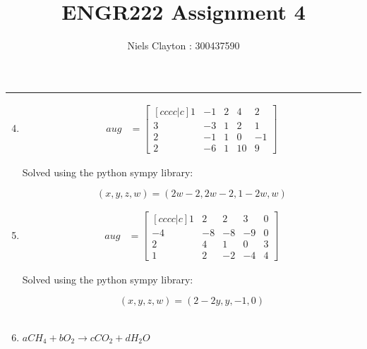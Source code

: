 \documentclass[a4paper,11pt]{article}
\title{\LARGE{\textbf{ENGR222 Assignment 4}}}
\author{Niels Clayton : 300437590}
\date{}
\begin{document}
\begin{preview}
    \maketitle
    \hrule

    
    \begin{enumerate}
        \setcounter{enumi}{3}

        \item

        \begin{align*}
            aug &=
            \begin{bmatrix}[cccc|c]
                1&-1&2&4&2\\ 
                3&-3&1&2&1\\ 
                2&-1&1&0&-1\\ 
                2&-6&1&10&9
            \end{bmatrix}
        \end{align*}

        Solved using the python sympy library:


        $$ (x,y,z,w) = (2w-2, 2w-2, 1-2w, w) $$

        \item

        \begin{align*}
            aug &=
            \begin{bmatrix}[cccc|c]
                1&2&2&3&0\\ 
                -4&-8&-8&-9&0\\ 
                2&4&1&0&3\\ 
                1&2&-2&-4&4
            \end{bmatrix}
        \end{align*}

        Solved using the python sympy library:


        $$ (x,y,z,w) = (2-2y, y, -1, 0) $$\\


        \setcounter{enumi}{6}

        \item $a CH_4 + b O_2\rightarrow c CO_2 +d H_2O$


\end{enumerate}
\end{preview}
\end{document}
